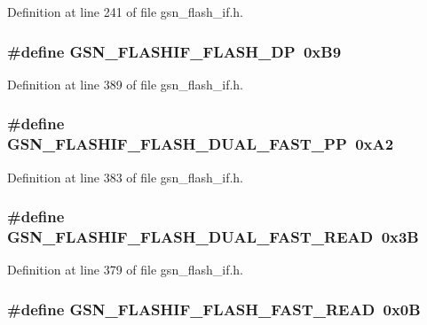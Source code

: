 Definition at line 241 of file gsn\_\-flash\_\-if.h.

\hypertarget{a00501_a99d00ac36ec9a0a644f5e86b4e9cbf60}{
\subsubsection[{GSN\_\-FLASHIF\_\-FLASH\_\-DP}]{\setlength{\rightskip}{0pt plus 5cm}\#define GSN\_\-FLASHIF\_\-FLASH\_\-DP~0xB9}}
\label{a00501_a99d00ac36ec9a0a644f5e86b4e9cbf60}


Definition at line 389 of file gsn\_\-flash\_\-if.h.

\hypertarget{a00501_af4275dba6f24912447b7129827a5d8bb}{
\subsubsection[{GSN\_\-FLASHIF\_\-FLASH\_\-DUAL\_\-FAST\_\-PP}]{\setlength{\rightskip}{0pt plus 5cm}\#define GSN\_\-FLASHIF\_\-FLASH\_\-DUAL\_\-FAST\_\-PP~0xA2}}
\label{a00501_af4275dba6f24912447b7129827a5d8bb}


Definition at line 383 of file gsn\_\-flash\_\-if.h.

\hypertarget{a00501_a2a496e4eb4b67f9cc17856bd0d4e2cfe}{
\subsubsection[{GSN\_\-FLASHIF\_\-FLASH\_\-DUAL\_\-FAST\_\-READ}]{\setlength{\rightskip}{0pt plus 5cm}\#define GSN\_\-FLASHIF\_\-FLASH\_\-DUAL\_\-FAST\_\-READ~0x3B}}
\label{a00501_a2a496e4eb4b67f9cc17856bd0d4e2cfe}


Definition at line 379 of file gsn\_\-flash\_\-if.h.

\hypertarget{a00501_a17279ad9c99a8da3f12b5db340c8108c}{
\subsubsection[{GSN\_\-FLASHIF\_\-FLASH\_\-FAST\_\-READ}]{\setlength{\rightskip}{0pt plus 5cm}\#define GSN\_\-FLASHIF\_\-FLASH\_\-FAST\_\-READ~0x0B}}
\label{a00501_a17279ad9c99a8da3f12b5db340c8108c}


